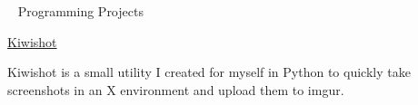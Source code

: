 

\begin{cventries}

%
	\cventry
	{~}
	{Programming Projects}
	{}
	{}
	{
		\begin{cvitems}
		\item {\href{https://github.com/AJubatus/Kiwishot}{Kiwishot}}
		\item {Kiwishot is a small utility I created for myself in Python to quickly take screenshots in an X environment and upload them to imgur.}
		\end{cvitems}
		}


\end{cventries}
